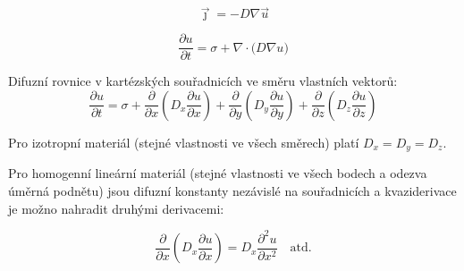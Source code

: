 \documentclass{article}
\begin{document}
\begin{multicols}{3}
$$\vec \jmath=-D\nabla \vec u$$

$${\frac{\partial u}{\partial t}=\sigma + \nabla\cdot \bigl(D\nabla u\bigr)}$$


Difuzní rovnice v kartézských souřadnicích ve směru vlastních vektorů:
$$\frac{\partial u}{\partial t}=\sigma +
  \frac{\partial}{\partial x}\left(D_x\frac{\partial u}{\partial x}\right)+
  \frac{\partial}{\partial y}\left(D_y\frac{\partial u}{\partial y}\right)+
  \frac{\partial}{\partial z}\left(D_z\frac{\partial u}{\partial z}\right)
  $$



Pro izotropní materiál (stejné vlastnosti ve všech směrech) platí $D_x=D_y=D_z$.

Pro homogenní lineární materiál (stejné vlastnosti ve všech bodech a odezva úměrná podnětu) jsou difuzní konstanty nezávislé na souřadnicích a kvaziderivace je možno nahradit druhými derivacemi:

$$\frac{\partial}{\partial x}\left(D_x\frac{\partial u}{\partial x}\right)=
D_x\frac{\partial ^2u}{\partial x^2}\quad \text{atd.}$$

\end{multicols}
\end{document}

